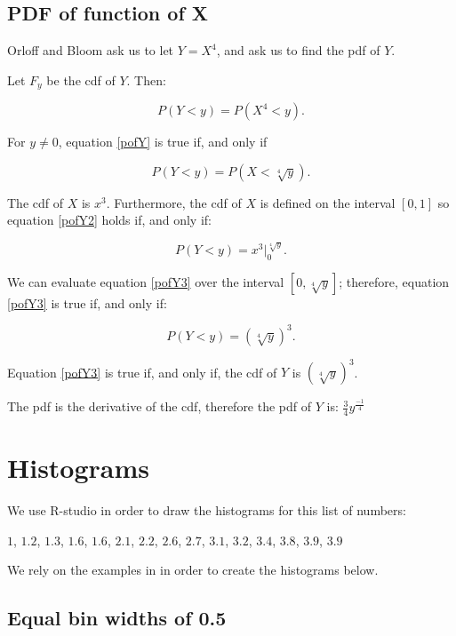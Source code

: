 \documentclass[a4paper,11pt]{article}
\begin{document}
\subsection{PDF of function of X}
Orloff and Bloom ask us to let $Y=X^4$, and ask us to find the pdf of $Y$.

Let $F_y$ be the cdf of $Y$. Then:

\begin{equation} \label{pofY}
  P\left(Y < y \right) = P \left( X^4 < y \right).
\end{equation}

For $y \neq 0$, equation \ref{pofY} is true if, and only if

\begin{equation} \label{pofY2}
  P\left(Y < y \right) = P \left( X < \sqrt[4]{y} \right).
\end{equation}

The cdf of $X$ is $x^3$. Furthermore, the cdf of $X$ is defined on
the interval $\left[0, 1 \right]$ so equation \ref{pofY2} holds if,
and only if:

\begin{equation}\label{pofY3}
  P\left(Y < y \right) = x^3 \bigg\rvert_0^{\sqrt[4]{y}}.
\end{equation}

We can evaluate equation \ref{pofY3} over the interval
$\left[ 0, \sqrt[4]{y} \right]$; therefore, equation \ref{pofY3} is
true if, and only if:


\begin{equation}\label{pofY4}
  P\left(Y < y \right) = \left( \sqrt[4]{y}\right)^3 .
\end{equation}

Equation \ref{pofY3} is true if, and only if, the cdf of $Y$ is
$\left( \sqrt[4]{y} \right)^3$.

The pdf is the derivative of the cdf, therefore the pdf of $Y$ is:
$\frac{3}{4} y^{\frac{-1}{4}}$

\section{Histograms}
We use R-studio in order to draw the histograms for this list of numbers:

$1$, $1.2$, $1.3$, $1.6$, $1.6$, $2.1$, $2.2$, $2.6$, $2.7$, $3.1$, $3.2$,
$3.4$, $3.8$, $3.9$, $3.9$

We rely on the examples in \cite{studio3r}  in order to create the histograms
below.
\subsection{Equal bin widths of 0.5}
\end{document}
